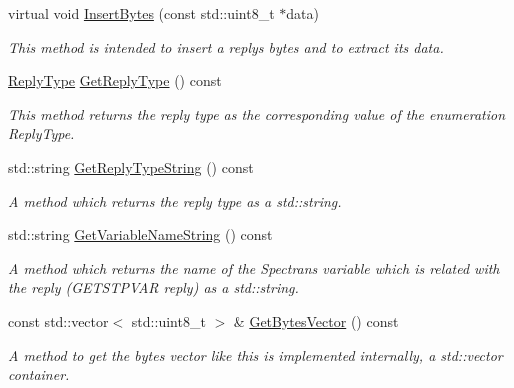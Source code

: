 \begin{DoxyCompactItemize}
virtual void \hyperlink{classReply_a005fb1894b469cc16e69bf93fed967af}{Insert\+Bytes} (const std\+::uint8\+\_\+t $\ast$data)
\begin{DoxyCompactList}\small\item\em This method is intended to insert a reply\textquotesingle{}s bytes and to extract its data. \end{DoxyCompactList}\item 
\mbox{\label{classReply_ab9eca743c910c467007488cdbb8125b8}} 
\hyperlink{classReply_aa873dec4817ed08a5212ec3ba2b5c807}{Reply\+Type} \hyperlink{classReply_ab9eca743c910c467007488cdbb8125b8}{Get\+Reply\+Type} () const
\begin{DoxyCompactList}\small\item\em This method returns the reply type as the corresponding value of the enumeration {\itshape Reply\+Type}. \end{DoxyCompactList}\item 
\mbox{\label{classReply_a72a6fd5b94e9842916f55b3420e8b05f}} 
std\+::string \hyperlink{classReply_a72a6fd5b94e9842916f55b3420e8b05f}{Get\+Reply\+Type\+String} () const
\begin{DoxyCompactList}\small\item\em A method which returns the reply type as a {\ttfamily std\+::string}. \end{DoxyCompactList}\item 
\mbox{\label{classReply_adb2d432c7d1dbe6bddd4b6900eeea7e3}} 
std\+::string \hyperlink{classReply_adb2d432c7d1dbe6bddd4b6900eeea7e3}{Get\+Variable\+Name\+String} () const
\begin{DoxyCompactList}\small\item\em A method which returns the name of the Spectran\textquotesingle{}s variable which is related with the reply (G\+E\+T\+S\+T\+P\+V\+AR reply) as a {\ttfamily std\+::string}. \end{DoxyCompactList}\item 
\mbox{\label{classReply_a027a08e481d00901d55bf7cfd5e7eb5f}} 
const std\+::vector$<$ std\+::uint8\+\_\+t $>$ \& \hyperlink{classReply_a027a08e481d00901d55bf7cfd5e7eb5f}{Get\+Bytes\+Vector} () const
\begin{DoxyCompactList}\small\item\em A method to get the bytes vector like this is implemented internally, a {\ttfamily std\+::vector} container. \end{DoxyCompactList}\item 

\end{DoxyCompactItemize}
